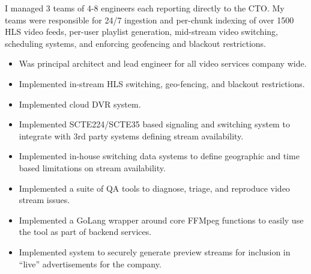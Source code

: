 \documentclass{article}
\begin{document}
\vspace{3pt} I managed 3 teams of 4-8 engineers each reporting directly to the CTO. My teams were responsible for 24/7 ingestion and per-chunk indexing of
over 1500 HLS video feeds, per-user playlist generation, mid-stream video switching, scheduling systems, and enforcing geofencing and blackout restrictions. 

\begin{multicols}{2}
  \begin{small}
    \begin{itemize}[leftmargin=*,label=\tiny{$\bullet$}]
    \item\begin{minipage}[t]{\linewidth}{Was principal architect and lead engineer for all video services company wide.}\end{minipage}
    \item\begin{minipage}[t]{\linewidth}{Implemented in-stream HLS switching, geo-fencing, and blackout restrictions.}\end{minipage}
    \item\begin{minipage}[t]{\linewidth}{Implemented cloud DVR system.}\end{minipage}
    \item\begin{minipage}[t]{\linewidth}{Implemented SCTE224/SCTE35 based signaling and switching system to integrate with 3rd party systems defining stream availability.}\end{minipage}
    \item\begin{minipage}[t]{\linewidth}{Implemented in-house switching data systems to define geographic and time based limitations on stream availability.}\end{minipage}
    \item\begin{minipage}[t]{\linewidth}{Implemented a suite of QA tools to diagnose, triage, and reproduce video stream issues.}\end{minipage}
    \item\begin{minipage}[t]{\linewidth}{Implemented a GoLang wrapper around core FFMpeg functions to easily use the tool as part of backend services.}\end{minipage}
    \item\begin{minipage}[t]{\linewidth}{Implemented system to securely generate preview streams for inclusion in ``live'' advertisements for the company.}\end{minipage}

\end{itemize}
\end{small}
\end{multicols}
\end{document}
